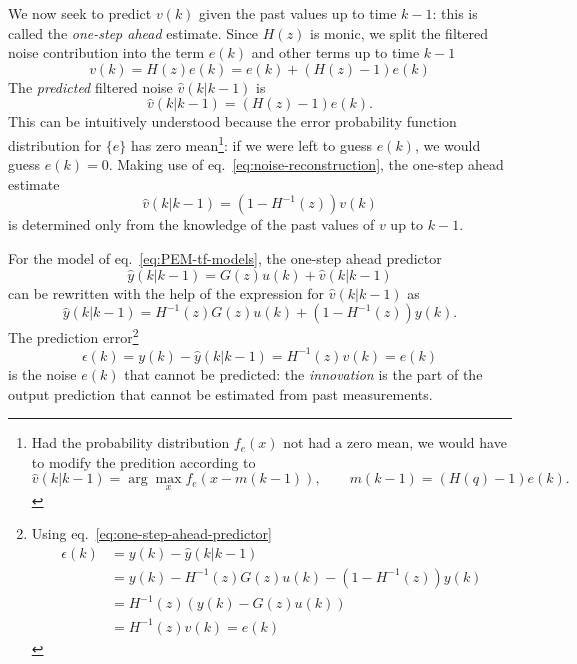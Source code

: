 We now seek to predict $v(k)$ given the past values up to time $k-1$: this is called the \emph{one-step ahead} estimate. Since $H(z)$ is monic, we split the filtered noise contribution into the term $e(k)$ and other terms up to time $k-1$
\begin{equation}
  \label{eq:prediction-split-filtered-noise}
  v(k) = H(z)e(k) = e(k) + (H(z)-1)e(k)
\end{equation}
The \emph{predicted} filtered noise $\hat{v}(k|k-1)$ is
\begin{equation*}
  \hat{v}(k|k-1) = (H(z)-1)e(k).
\end{equation*}
This can be intuitively understood because the error probability function distribution for $\{e\}$ has zero mean\footnote{Had the probability distribution $f_e(x)$ not had a zero mean, we would have to modify the predition according to
  \begin{equation*}
    \hat{v}(k|k-1) = \arg\max_x f_e(x - m(k-1)),\hspace{2em} m(k-1) = (H(q)-1)e(k).
  \end{equation*}}: if we were left to guess $e(k)$, we would guess $e(k)=0$. Making use of eq.~\eqref{eq:noise-reconstruction}, the one-step ahead estimate
\begin{equation}
  \label{eq:filtered-noise-one-step-prediction}
  \hat{v}(k|k-1) = \left(1-H^{-1}(z)\right)v(k)
\end{equation}
is determined only from the knowledge of the past values of $v$ up to $k-1$.

For the model of eq.~\eqref{eq:PEM-tf-models}, the one-step ahead predictor
\begin{equation*}
  \hat{y}(k|k-1) = G(z)u(k) + \hat{v}(k|k-1)
\end{equation*}
can be rewritten with the help of the expression for $\hat{v}(k|k-1)$ as
\begin{equation}
  \label{eq:one-step-ahead-predictor}
  \hat{y}(k|k-1) = H^{-1}(z)G(z)u(k) + \left(1-H^{-1}(z)\right) y(k).
\end{equation}
The prediction error\footnote{Using eq.~\eqref{eq:one-step-ahead-predictor}
\begin{align*}
  \epsilon(k) &= y(k) - \hat{y}(k|k-1) \\
              &= y(k) - H^{-1}(z)G(z)u(k) - \left(1-H^{-1}(z)\right) y(k) \\
              &= H^{-1}(z)(y(k) - G(z)u(k)) \\
              &= H^{-1}(z)v(k) = e(k)
\end{align*}}
\begin{equation}
  \label{eq:one-step-ahead-predictor-error}
  \epsilon(k) = y(k) - \hat{y}(k|k-1) = H^{-1}(z)v(k) = e(k)
\end{equation}
is the noise $e(k)$ that cannot be predicted: the \emph{innovation} is the part of the output prediction that cannot be estimated from past measurements.

